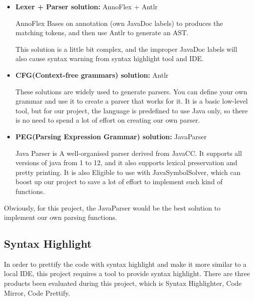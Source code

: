 \documentclass[runningheads]{llncs}
\begin{document}
\begin{itemize}
	\item \textbf{Lexer + Parser solution:} AnnoFlex\cite{AnnoFlex} + Antlr\cite{Antlr}

	AnnoFlex Bases on annotation (own JavaDoc labels) to produces the matching tokens, and then use Antlr to generate an AST.

	This solution is a little bit complex, and the improper JavaDoc labels will also cause syntax warning from syntax highlight tool and IDE.

	\item \textbf{CFG(Context-free grammars) solution:} Antlr\cite{Antlr}

	These solutions are widely used to generate parsers. You can define your own grammar and use it to create a parser that works for it. It is a basic low-level tool, but for our project, the language is predefined to use Java only, so there is no need to spend a lot of effort on creating our own parser.

	\item \textbf{PEG(Parsing Expression Grammar) solution:} JavaParser\cite{JavaParser}

	Java Parser is A well-organised parser derived from JavaCC. It supports all versions of java from 1 to 12, and it also supports lexical preservation and pretty printing. It is also Eligible to use with JavaSymbolSolver, which can boost up our project to save a lot of effort to implement such kind of functions.
\end{itemize}
Obviously, for this project, the JavaParser would be the best solution to implement our own parsing functions.

\subsection{Syntax Highlight}
In order to prettify the code with syntax highlight and make it more similar to a local IDE, this project requires a tool to provide syntax highlight. There are three products been evaluated during this project, which is Syntax Highlighter\cite{syntaxhighlighter}, Code Mirror\cite{codemirror}, Code Prettify\cite{code-prettify}.
\end{document}
